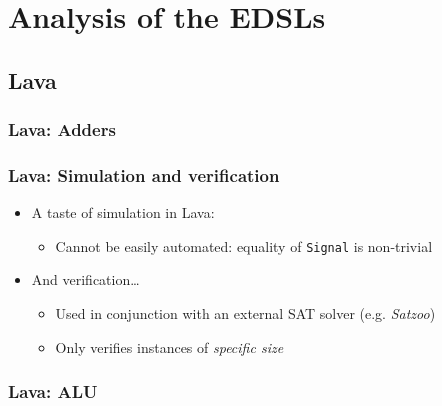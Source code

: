 \documentclass{beamer}
\begin{document}
    \section{Analysis of the EDSLs}
    \label{sec:analysis-of-the-edsls}
        \frame{\sectionpage}

        \subsection{Lava}
        \label{subsec:lava}

            \begin{frame}
                \frametitle{Lava: Adders}
            \end{frame}

            \begin{frame}
                \frametitle{Lava: Simulation and verification}

                \begin{itemize}
                    \item A taste of simulation in Lava:
                        \begin{itemize}
                            \item Cannot be easily automated: equality of \texttt{Signal} is non-trivial
                        \end{itemize}

                    \item And verification\ldots
                        \begin{itemize}
                            \item Used in conjunction with an external SAT solver (e.g. \emph{Satzoo})
                            \item Only verifies instances of \emph{specific size}
                        \end{itemize}
                \end{itemize}
            \end{frame}

            \begin{frame}
                \frametitle{Lava: ALU}
            \end{frame}
\end{document}
